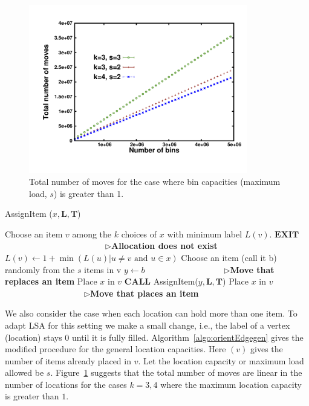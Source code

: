\begin{figure}[h!]
   \centering  
    \includegraphics[width=0.85\textwidth]{totalGen-3-2.pdf}
    \caption{Total number of moves for the case where bin capacities (maximum load, $s$) is greater than 1.}
    \label{fig:totalGen}
    \end{figure}


\begin{algorithm}[h!]
\caption{AssignItem ($x, \mathbf{L},\mathbf{T}$)}
\label{algo:orientEdgegen}
\begin{algorithmic}[1]
\STATE Choose an item $v$ among the $k$ choices of $x$ with minimum label $L(v)$.
\STATE $\mathbf{EXIT}$  ~~~~~~~~~~~~~~~~~~~~~~~ $\rhd${\textbf{Allocation does not exist}}
\ELSE
{}
\STATE $L(v) \leftarrow 1+ \min{(L(u)| u \neq v \text{~and $u \in x$})}$
\ENDIF
{}
\STATE Choose an item (call it b) randomly from the $s$ items in v
\STATE $y\leftarrow b$~~~~~~~~~~~~~~~~~~ $\rhd${\textbf{Move that replaces an item}}
\STATE Place $x$ in $v$
\STATE $\mathbf{CALL}$ {AssignItem($y, \mathbf{L},\mathbf{T}$)}
\ELSE  
\STATE Place $x$ in $v$ ~~~~~~~~~~~~~~~~~~ $\rhd${\textbf{Move that places an item}}
\ENDIF
\ENDIF
\end{algorithmic}
\end{algorithm}
We also consider the case when each location can hold more than one item. To adapt LSA for this setting we make a small change, i.e., the label of a vertex (location) stays 0 until it is fully filled. Algorithm~\ref{algo:orientEdgegen} gives the modified procedure for the general location capacities. Here {}$(v)$ gives the number of items already placed in $v$. Let the location capacity or maximum load allowed be $s$. Figure~\ref{fig:totalGen} suggests that the total number of moves are linear in the number of locations for the cases $k=3,4$ where the maximum location capacity is greater than $1$.

